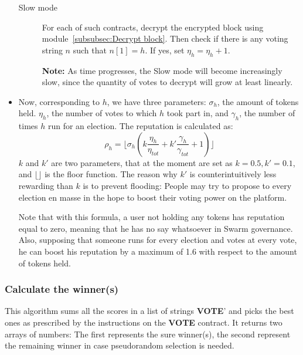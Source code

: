 \documentclass[submission, copyright,creativecommons,sharealike,noncommercial]{eptcs}
\newcommand{\Vote}{\textbf{VOTE}\xspace}
\begin{document}
\begin{itemize}
\begin{description}
			\item[Slow mode] For each of such contracts, decrypt the encrypted block using module~\ref{subsubsec:Decrypt block}. Then check if there is any voting string $n$ such that $n[1]=h$. If yes, set $\eta_{h} = \eta_{h}+1$.
			
			\textbf{Note:} As time progresses, the Slow mode will become increasingly slow, since the quantity of votes to decrypt will grow at least linearly.
		\end{description}

		\item Now, corresponding to $h$, we have three parameters: $\sigma_h$, the amount of tokens held. $\eta_h$, the number of votes to which $h$ took part in, and $\gamma_h$, the number of times $h$ run for an election. The reputation is calculated as:
		\[
		\rho_h = \Big\lfloor \sigma_h\left( k \frac{\eta_h}{\eta_{tot}} + k' \frac{\gamma_h}{\gamma_{tot}} + 1\right) \Big\rfloor
		\]
		$k$ and $k'$ are two parameters, that at the moment are set as $k=0.5, k'=0.1$, and $\lfloor \rfloor$ is the floor function. The reason why $k'$ is counterintuitively less rewarding than $k$ is to prevent flooding: People may try to propose to every election en masse in the hope to boost their voting power on the platform. 
		
		Note that with this formula, a user not holding any tokens has reputation equal to zero, meaning that he has no say whatsoever in Swarm governance. Also, supposing that someone runs for every election and votes at every vote, he can boost his reputation by a maximum of 1.6 with respect to the amount of tokens held.
	\end{itemize}

\subsubsection{Calculate the winner(s)}\label{subsubsec:Get winner}
	This algorithm sums all the scores in a list of strings \Vote' and picks the best ones as prescribed by the instructions on the \Vote contract. It returns two arrays of numbers: The first represents the sure winner(s), the second represent the remaining winner in case pseudorandom selection is needed.
	
\end{document}
